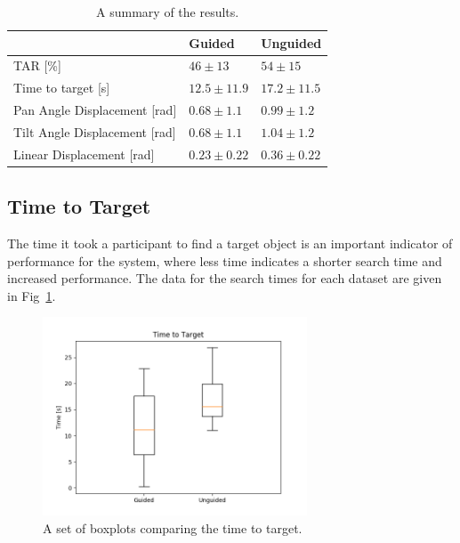 \documentclass[runningheads]{llncs}
\newcommand\todo[1]{\textcolor{red}{#1}}
\begin{document}
\begin{table}
  \centering
  \caption{A summary of the results. }\label{tab:results}
  \begin{tabular}{p{5cm}p{2cm}p{2cm}}
    \toprule
    & \textbf{Guided} & \textbf{Unguided} \\\midrule
    TAR [\%]           & $46\pm13$ & $54\pm15$   \\\midrule
    Time to target [s] & $12.5\pm11.9$ & $17.2\pm11.5$ \\\midrule
    Pan Angle Displacement [rad] & $0.68\pm1.1$ & $0.99\pm1.2$ \\\midrule
    Tilt Angle Displacement [rad] & $0.68\pm1.1$ & $1.04\pm1.2$ \\\midrule
    Linear Displacement [rad] & $0.23\pm0.22$ & $0.36\pm0.22$ \\\midrule
    \bottomrule
  \end{tabular}
\end{table}

\subsection{Time to Target}

The time it took a participant to find a target object is an important indicator of performance for the system, where less time indicates a shorter search time and increased performance.
The data for the search times for each dataset are given in Fig~\ref{fig:boxplot-time}.%

\begin{figure}
  \centering
  \includegraphics[width=0.7\textwidth]{figures/boxplot_time_to_target.png}
  \caption{A set of boxplots comparing the time to target. }\label{fig:boxplot-time}
\end{figure}
\end{document}

